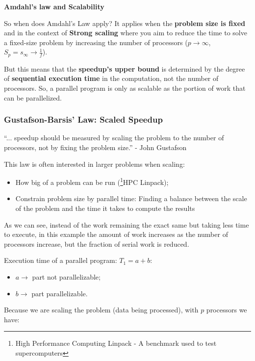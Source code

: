 \par {\large \textbf{Amdahl's law and Scalability}}
\par So when does Amdahl's Law apply? It applies when the \textbf{problem size is fixed} and in the context of \textbf{Strong scaling} where you aim to reduce the time to solve a fixed-size problem by increasing the number of processors ($p \rightarrow \infty$, $S_p=s_\infty \rightarrow \frac{1}{f}$).
\par But this means that the \textbf{speedup's upper bound} is determined by the degree of \textbf{sequential execution time} in the computation, not the number of processors. So, a parallel program is only as scalable as the portion of work that can be parallelized. %
%
\clearpage
%
\subsubsection{Gustafson-Barsis' Law: Scaled Speedup}
\enquote{... speedup should be measured by scaling the problem to the number of processors, not by fixing the problem size.}{ \small - John Gustafson}
\par This law is often interested in larger problems when scaling:
\begin{itemize}
    \item How big of a problem can be run (\footnote{High Performance Computing Linpack - A benchmark used to test supercomputers}{HPC Linpack});
    \item Constrain problem size by parallel time: Finding a balance between the scale of the problem and the time it takes to compute the results
\end{itemize}
\par As we can see, instead of the work remaining the exact same but taking less time to execute, in this example the amount of work increases as the number of processors increase, but the fraction of serial work is reduced.
\par Execution time of a parallel program: $T_1 = a + b$:
\begin{itemize}
    \item $a \rightarrow$ part not parallelizable;
    \item $b \rightarrow$ part parallelizable.
\end{itemize}
\par Because we are scaling the problem (data being processed), with $p$ processors we have:
